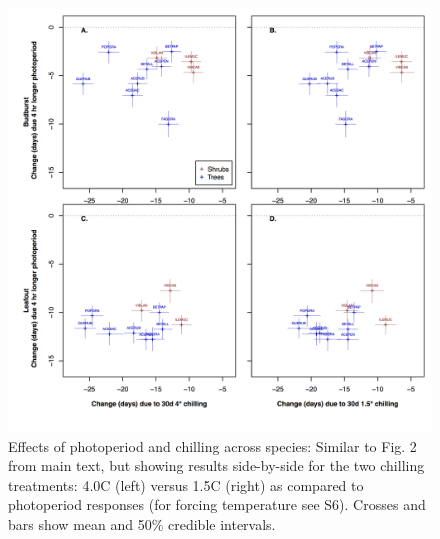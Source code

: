 \documentclass{article}
\begin{document}
\begin{figure}
\label{figS7}
\includegraphics[width=1\textwidth]{FigChillPhoto_4panel.png}
\caption{Effects of photoperiod and chilling across species: Similar to Fig. 2 from main text, but showing results side-by-side for the two chilling treatments: 4.0\degree C (left) versus 1.5\degree C (right) as compared to photoperiod responses (for forcing temperature see S6). Crosses and bars show mean and 50\% credible intervals.}
\end{figure}
\end{document}
